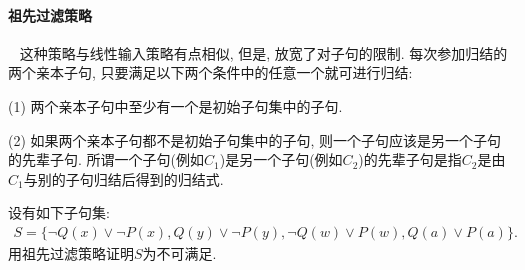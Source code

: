 \paragraph{祖先过滤策略}~{}
    这种策略与线性输入策略有点相似, 但是, 放宽了对子句的限制. 每次参加归结的两个亲本子句, 只要满足以下两个条件中的任意一个就可进行归结:

(1) 两个亲本子句中至少有一个是初始子句集中的子句.

(2) 如果两个亲本子句都不是初始子句集中的子句, 则一个子句应该是另一个子句的先辈子句. 所谓一个子句(例如$C_1$)是另一个子句(例如$C_2$)的先辈子句是指$C_2$是由$C_1$与别的子句归结后得到的归结式.
\begin{example}
设有如下子句集:
\begin{align}
  S=\{\neg Q(x)\vee \neg P(x),  Q(y)\vee \neg P(y), \neg Q(w)\vee P(w) ,  Q(a)\vee P(a)\}.
\end{align}
用祖先过滤策略证明$S$为不可满足.
\end{example}
